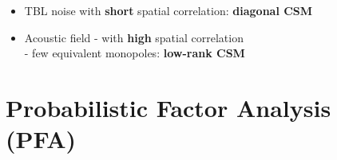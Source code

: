 \documentclass[10pt,xcolor=x11names,compress, show notes]{beamer}%
\begin{document}
\begin{frame}[t]{\insertsectionhead}
	\begin{itemize}
		\setlength{\itemindent}{1cm}
		\item<3-> \textcolor{rouge}{TBL noise} with \textbf{short} spatial correlation: {\bfseries diagonal CSM}\\		
		\item<3-> \textcolor{source}{Acoustic field} - with \textbf{high} spatial correlation \\
		\hspace{3cm} - few equivalent monopoles: {\bfseries low-rank CSM}\\ %
	\end{itemize}
\end{frame}


\section{Probabilistic Factor Analysis (PFA)}
\begin{frame}
\end{frame}
\end{document}
